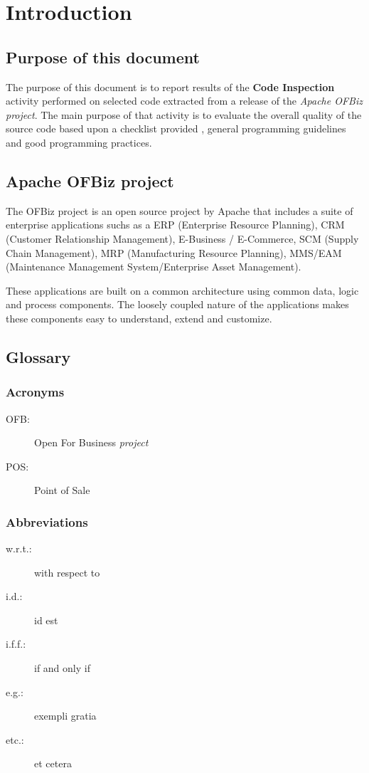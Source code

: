 \section{Introduction}

\subsection{Purpose of this document}
The purpose of this document is to report results of the \textbf{Code Inspection} activity performed on selected code extracted from a release of the \textit{Apache OFBiz project}. The main purpose of that activity is to evaluate the overall quality of the source code based upon a checklist provided \cite{Assignment}, general programming guidelines and good programming practices.

\subsection{Apache OFBiz project}
The OFBiz project is an open source project by Apache that  includes a suite of enterprise applications suchs as a ERP (Enterprise Resource Planning), CRM (Customer Relationship Management), E-Business / E-Commerce, SCM (Supply Chain Management), MRP (Manufacturing Resource Planning), MMS/EAM (Maintenance Management System/Enterprise Asset Management).

These applications are built on a common architecture using common data, logic and process components. The loosely coupled nature of the applications makes these components easy to understand, extend and customize\cite{OFBiz}.

\subsection{Glossary}
\subsubsection{Acronyms}
\begin{description}
		\item [OFB:] Open For Business \emph{project}
		\item [POS:] Point of Sale
	\end{description}
\subsubsection{Abbreviations}
	\begin{description}
		\item [w.r.t.:] with respect to
		\item [i.d.:] id est
		\item [i.f.f.:] if and only if
		\item [e.g.:] exempli gratia
		\item [etc.:] et cetera
	\end{description}


